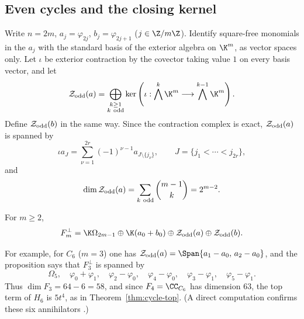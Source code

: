 \subsection{Even cycles and the closing kernel}
\label{sec:even-cycles}

Write $n=2m$, $a_j=\varphi_{2j}$, $b_j=\varphi_{2j+1}$
($j\in\Z/m\Z$). Identify square-free monomials in the $a_j$ with the
standard basis of the exterior algebra on $\K^m$, as vector spaces
only. Let $\iota$ be exterior contraction by the covector taking
value $1$ on every basis vector, and let
\[
\mathcal Z_{\rm odd}(a)=
\bigoplus_{\substack{k\ge1\\ k\ {\rm odd}}}
\ker\left(\iota:\bigwedge^k\K^m\longrightarrow
                         \bigwedge^{k-1}\K^m\right).
\]
Define $\mathcal Z_{\rm odd}(b)$ in the same way. Since the contraction
complex is exact, $\mathcal Z_{\rm odd}(a)$ is spanned by
\begin{equation}\label{eq:alternating-boundaries}
\iota a_J=
\sum_{\nu=1}^{2r}(-1)^{\nu-1}a_{J\setminus\{j_\nu\}},
\qquad J=\{j_1<\cdots<j_{2r}\},
\end{equation}
and
\begin{equation}\label{eq:odd-boundary-dimension}
\dim\mathcal Z_{\rm odd}(a)
=\sum_{k\ {\rm odd}}\binom{m-1}{k}=2^{m-2}.
\end{equation}

\begin{proposition}\label{prop:even-cycle-annihilator}
For $m\ge2$,
\begin{equation}\label{eq:even-cycle-annihilator}
F_m^\perp=
\K\Omega_{2m-1}\oplus\K(a_0+b_0)
\oplus\mathcal Z_{\rm odd}(a)\oplus\mathcal Z_{\rm odd}(b).
\end{equation}
\end{proposition}

For example, for $C_6$ ($m=3$) one has
$\mathcal Z_{\rm odd}(a)=\Span\{a_1-a_0,\,a_2-a_0\}$, and the
proposition says that $F_3^\perp$ is spanned by
\[
\Omega_5,\quad \varphi_0+\varphi_1,\quad
\varphi_2-\varphi_0,\quad\varphi_4-\varphi_0,\quad
\varphi_3-\varphi_1,\quad\varphi_5-\varphi_1 .
\]
Thus $\dim F_3=64-6=58$, and since $F_4=\CC_{C_6}$ has dimension $63$,
the top term of $H_6$ is $5t^4$, as in Theorem~\ref{thm:cycle-top}.
(A direct computation confirms these six annihilators
\cite[\texttt{cycles/annihilators.py}]{Cert}.)

